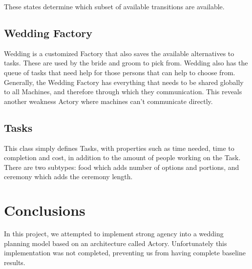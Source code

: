 \documentclass{sig-alternate}
\begin{document}
These states determine which subset of available transitions are available.

\subsection{Wedding Factory}
Wedding is a customized Factory that also saves the available alternatives to tasks. These are used by the bride and groom to pick from. Wedding also has the queue of tasks that need help for those persons that can help to choose from. Generally, the Wedding Factory has everything that needs to be shared globally to all Machines, and therefore through which they communication. This reveals another weakness Actory where machines can't communicate directly.

\subsection{Tasks}
This class simply defines Tasks, with properties such as time needed, time to completion and cost, in addition to the amount of people working on the Task. There are two subtypes: food which adds number of options and portions, and ceremony which adds the ceremony length.

\section{Conclusions}
In this project, we attempted to implement strong agency into a wedding planning model based on an architecture called Actory. Unfortunately this implementation was not completed, preventing us from having complete baseline results.


 

\end{document}
